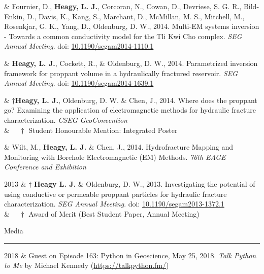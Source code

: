 \documentclass[a4paper, 11pt]{article}
\newcommand{\doi}[1]{doi: \href{https://doi.org/#1}{#1}}
\newcommand{\heading}[1]{
    \begin{minipage}[t]{\textwidth}
    \vspace{0.05cm}
    {\LARGE #1}\\
    \vspace{-0.24cm}
    \hrule
    \end{minipage}
    \vspace{0.05cm}

}
\begin{document}
\begin{entryright}
& Fournier, D., \textbf{Heagy, L. J.}, Corcoran, N., Cowan, D., Devriese, S. G. R., Bild-Enkin, D., Davis, K., Kang, S., Marchant, D., McMillan, M. S., Mitchell, M., Rosenkjar, G. K., Yang, D., Oldenburg, D. W., 2014. Multi-EM systems inversion - Towards a common conductivity model for the Tli Kwi Cho complex. \emph{SEG Annual Meeting}. \doi{10.1190/segam2014-1110.1}
\end{entryright}

\begin{entryright}
& \textbf{Heagy, L. J.}, Cockett, R., \& Oldenburg, D. W., 2014. Parametrized inversion framework for proppant volume in a hydraulically fractured reservoir. \emph{SEG Annual Meeting}. \doi{10.1190/segam2014-1639.1}
\end{entryright}

\begin{entryright}
& $\dagger$\textbf{Heagy, L. J.}, Oldenburg, D. W. \& Chen, J., 2014. Where does the proppant go? Examining the application of electromagnetic methods for hydraulic fracture characterization. \emph{CSEG GeoConvention} \\
& $\quad \dagger$ Student Honourable Mention: Integrated Poster
\end{entryright}

\begin{entryright}
& Wilt, M., \textbf{Heagy, L. J.} \& Chen, J., 2014. Hydrofracture Mapping and Monitoring with Borehole Electromagnetic (EM) Methods. \emph{76th EAGE Conference and Exhibition}
\end{entryright}

\begin{entryright}
2013 & $\dagger$ \textbf{Heagy L. J.} \& Oldenburg, D. W., 2013. Investigating the potential of using conductive or permeable proppant particles for hydraulic fracture characterization. \emph{SEG Annual Meeting}. \doi{10.1190/segam2013-1372.1} \\
& $\quad\dagger$ Award of Merit (Best Student Paper, Annual Meeting)
\end{entryright}




\heading{Media}

\begin{entryright}
2018 & Guest on Episode 163: Python in Geoscience, May 25, 2018. \emph{Talk Python to Me} by Michael Kennedy (\href{https://talkpython.fm/episodes/show/163/python-in-geoscience}{https://talkpython.fm/})
\end{entryright}
\end{document}
